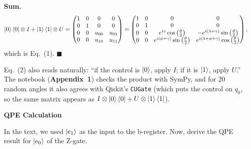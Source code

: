 \documentclass[a4paper, 10pt]{article}
\begin{document}
\begin{solution}
	\noindent \textbf{Sum.}
	\[
		\ket{0}\bra{0} \otimes I + \ket{1}\bra{1} \otimes U = \begin{pmatrix}
			1 & 0 & 0      & 0      \\
			0 & 1 & 0      & 0      \\
			0 & 0 & u_{00} & u_{01} \\
			0 & 0 & u_{10} & u_{11}
		\end{pmatrix} = \begin{pmatrix}
			1 & 0 & 0                                                        & 0                                                                  \\
			0 & 1 & 0                                                        & 0                                                                  \\
			0 & 0 & e^{i \gamma} \cos\left(\frac{\theta}{2}\right)                & -e^{i \left(\lambda + \gamma\right)} \sin\left(\frac{\theta}{2}\right)       \\
			0 & 0 & e^{i \left(\phi + \gamma\right)} \sin\left(\frac{\theta}{2}\right) & e^{i \left(\lambda + \phi + \gamma\right)} \cos\left(\frac{\theta}{2}\right)
		\end{pmatrix},
	\]
	which is Eq.~(1). \( \blacksquare \)

	\myspace

	\noindent Eq.~(2) also reads naturally: ``if the control is \( \ket{0} \), apply \( I \); if it is \( \ket{1} \), apply \( U \).''
	The notebook (\textbf{Appendix~1}) checks the product with SymPy, and for 20 random angles it also agrees with Qiskit's \texttt{CUGate} (which puts the control on \( q_0 \), so the same matrix appears as \( I \otimes \ket{0}\bra{0} + U \otimes \ket{1}\bra{1} \)).
\end{solution}

\begin{problem}
\textbf{QPE Calculation}
\par In the text, we used \( \ket{e_1} \) as the input to the b-register.
Now, derive the QPE result for \( \ket{e_0} \) of the Z-gate.
\end{problem}
\end{document}
